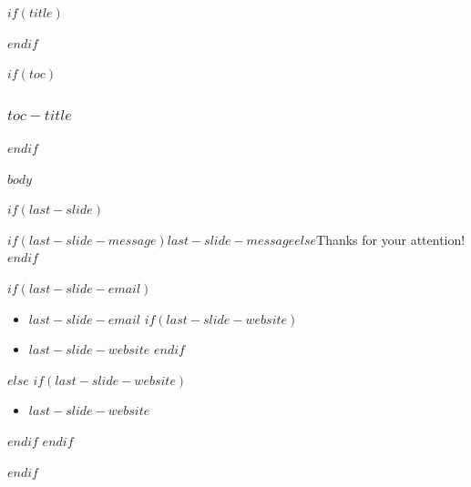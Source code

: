\documentclass[$if(fontsize)$$fontsize$,$endif$$if(handout)$handout,$endif$$if(aspectratio)$aspectratio=$aspectratio$,$endif$]{beamer}
\title$if(short-title)$[$short-title$]$endif${$title$}
\subtitle{$subtitle$}
\author{$for(author)$\texorpdfstring{$author$}{$author$}$sep$ \and $endfor$}
\date{$date$}
\institute{$for(institute)$$institute$$sep$ \and $endfor$}
\newcommand{\biemtocname}{$toc-title$}
\newcommand{\biemtocname}{Outline}
\begin{document}
$if(title)$
\begin{frame}[plain]{}
  \titlepage
\end{frame}
$endif$

$if(toc)$
\begin{frame}
  \frametitle{\biemtocname}
  \tableofcontents
\end{frame}
$endif$

$body$

$if(last-slide)$
\begin{frame}[fragile]{}
  \vspace{0.5cm}

  \begin{center}
    {\Large $if(last-slide-message)$$last-slide-message$$else$Thanks for your attention!$endif$}
  \end{center}

  \vfill

$if(last-slide-email)$
  \begin{itemize}
    \item[{\protect\faEnvelope}] $last-slide-email$
$if(last-slide-website)$
    \item[{\protect\faLaptop}] $last-slide-website$
$endif$
  \end{itemize}
$else$
$if(last-slide-website)$
  \begin{itemize}
    \item[{\protect\faLaptop}] $last-slide-website$
  \end{itemize}
$endif$
$endif$

\end{frame}
$endif$
\end{document}

